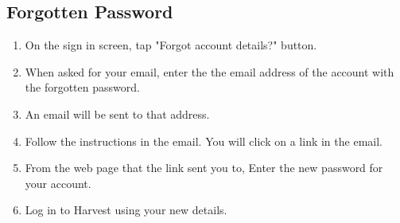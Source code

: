 \documentclass[11pt]{article}
\begin{document}
\subsection{Forgotten Password}
\begin{enumerate}
\item On the sign in screen, tap "Forgot account details?" button.
\item When asked for your email, enter the the email address of the account with the forgotten password.
\item An email will be sent to that address.
\item Follow the instructions in the email. You will click on a link in the email.
\item From the web page that the link sent you to, Enter the new password for your account.
\item Log in to Harvest using your new details.
\end{enumerate}
\end{document}
